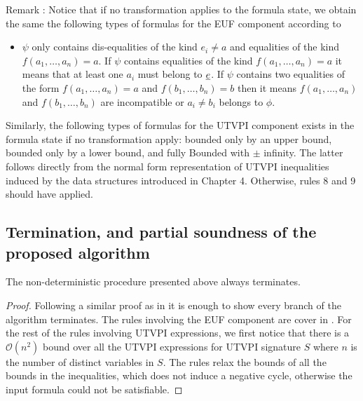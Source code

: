 Remark \label{my_remark}: Notice that if no 
transformation applies 
to the formula state, we obtain the same 
the following types of formulas for the EUF 
component according to \cite{ghilardi2020compactly} 

\begin{itemize}
  \item $\psi$ only contains dis-equalities of the kind $e_i \neq a$ and equalities of
    the kind $f(a_1, \dots, a_n) = a$. If $\psi$ contains equalities of the
    kind $f(a_1, \dots, a_n) = a$ it means that at least one $a_i$ must belong
    to $\underline{e}$. If $\psi$ contains two equalities of the form
    $f(a_1, \dots, a_n) = a$ and $f(b_1, \dots, b_n) = b$ then it means
    $f(a_1, \dots, a_n)$ and $f(b_1, \dots, b_n)$ are incompatible or $a_i \neq b_i$
    belongs to $\phi$.
\end{itemize}

Similarly, the following types of formulas for 
the UTVPI component exists in the
formula state if no transformation apply: bounded 
only by an upper bound, 
bounded only by a lower bound, and fully Bounded 
with $\pm$ infinity. The
latter follows directly from the normal 
form representation of UTVPI inequalities
induced by the data structures introduced 
in Chapter 4. Otherwise, rules
8 and 9 should have applied.

\subsection{Termination, and partial soundness of the
proposed algorithm}

\begin{lemma}
  The non-deterministic procedure presented above 
  always terminates.
\end{lemma}

\begin{proof}
  Following a similar proof as in \cite{ghilardi2020compactly}
  it is enough to show every branch of the algorithm terminates.
  The rules involving the EUF component are cover in
  \cite{ghilardi2020compactly}. For the rest of the rules
  involving UTVPI expressions, we first notice that there is a 
  $\mathcal{O}(n^2)$ bound over all the UTVPI expressions
  for UTVPI signature $S$ where $n$ is the number of distinct
  variables in $S$. The rules relax the bounds of all the
  bounds in the inequalities, which does not induce a negative
  cycle, otherwise the input formula could not be satisfiable.
\end{proof} 

